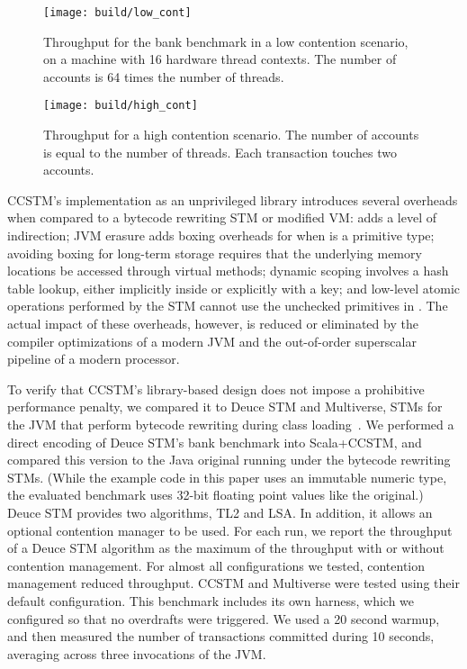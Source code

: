 
\begin{figure}
  \centering \texttt{[image: build/low\_cont]}

\caption{Throughput for the bank benchmark in a low contention scenario,
on a machine with 16 hardware thread contexts.  The number of accounts
is 64 times the number of threads.}

  \label{fig:lowcont}
\end{figure}

\begin{figure}
  \centering \texttt{[image: build/high\_cont]}

\caption{Throughput for a high contention scenario.  The number of accounts is
equal to the number of threads.  Each transaction touches two accounts.}

  \label{fig:highcont}
\end{figure}

CCSTM's implementation as an unprivileged library introduces several
overheads when compared to a bytecode rewriting STM or modified VM:
 adds a level of indirection; JVM erasure adds boxing overheads
for  when  is a primitive type; avoiding boxing
for long-term storage requires that the underlying memory locations
be accessed through virtual methods; dynamic scoping involves a hash
table lookup, either implicitly inside  or explicitly
with a  key; and low-level atomic operations performed by
the STM cannot use the unchecked primitives in .
The actual impact of these overheads, however, is reduced or eliminated
by the compiler optimizations of a modern JVM and the out-of-order
superscalar pipeline of a modern processor.

To verify that CCSTM's library-based design does not impose a prohibitive
performance penalty, we compared it to Deuce STM and Multiverse, STMs for
the JVM that perform bytecode rewriting during class
loading~\cite{deucestm,multiverse}.
We performed a direct encoding of Deuce STM's bank benchmark into
Scala+CCSTM, and compared this version to the Java original running
under the bytecode rewriting STMs.  (While the example code in this paper uses an
immutable  numeric type, the evaluated benchmark uses 32-bit
floating point values like the original.)  Deuce STM provides two algorithms,
TL2 and LSA.  In addition, it allows an optional contention manager to
be used.  For each run, we report the throughput of a Deuce STM algorithm
as the maximum of the throughput with or without contention management.
For almost all configurations we tested, contention management reduced
throughput.  CCSTM and Multiverse were tested using their default
configuration.
This benchmark includes its own harness, which we configured so
that no overdrafts were triggered.  We used a 20 second warmup, and
then measured the number of transactions committed during 10 seconds,
averaging across three invocations of the JVM.

